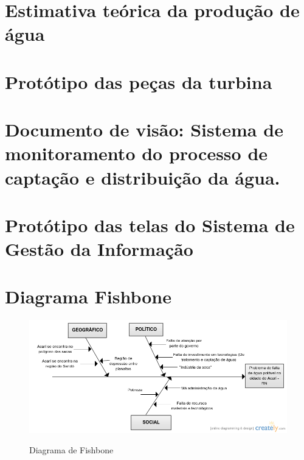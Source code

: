 \begin{anexosenv}
% 
%  
% 
% 
%   
%   
% 
%   
% 

\chapter{Estimativa teórica da produção de água}
  \label{estimativa_producao_agua}
  

\chapter{Protótipo das peças da turbina}
  \label{prototipos_catia}
  
  
\chapter{Documento de visão: Sistema de monitoramento do processo de captação e distribuição da água.}
  
  \label{doc_visao}
  
  
\chapter{Protótipo das telas do Sistema de Gestão da Informação}  
  
  \label{prototipo_sgi}
  
  
\chapter{Diagrama Fishbone}
  
  \begin{figure}[!h]
    \centering
    \includegraphics[scale = 0.7, angle = 90]{editaveis/figuras/fishbone}
    \label{fishbone}
    \caption{Diagrama de Fishbone}
   \end{figure}
   \FloatBarrier

\end{anexosenv}